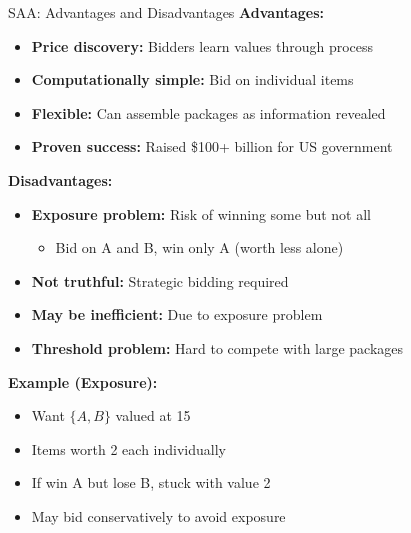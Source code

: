 \documentclass[xcolor={x11names}, aspectratio=169 ]{beamer}
\begin{document}
\begin{frame}{SAA: Advantages and Disadvantages}
\textbf{Advantages:}
\begin{itemize}
  \item \textbf{Price discovery:} Bidders learn values through process
  \item \textbf{Computationally simple:} Bid on individual items
  \item \textbf{Flexible:} Can assemble packages as information revealed
  \item \textbf{Proven success:} Raised \$100+ billion for US government
\end{itemize}

\textbf{Disadvantages:}
\begin{itemize}
  \item \textbf{Exposure problem:} Risk of winning some but not all
  \begin{itemize}
    \item Bid on A and B, win only A (worth less alone)
  \end{itemize}
  \item \textbf{Not truthful:} Strategic bidding required
  \item \textbf{May be inefficient:} Due to exposure problem
  \item \textbf{Threshold problem:} Hard to compete with large packages
\end{itemize}

\textbf{Example (Exposure):}
\begin{itemize}
  \item Want $\{A, B\}$ valued at 15
  \item Items worth 2 each individually
  \item If win A but lose B, stuck with value 2
  \item May bid conservatively to avoid exposure
\end{itemize}
\end{frame}
\end{document}
